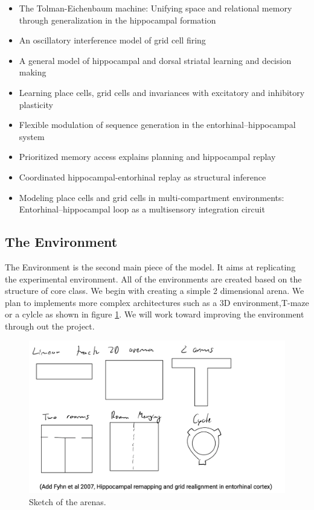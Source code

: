\documentclass{article}
\begin{document}
\begin{itemize}
 
    \item The Tolman-Eichenbaum machine: Unifying space and relational memory through generalization in the hippocampal formation \cite{whittington2020tolman}
    \item An oscillatory interference model of grid cell firing \cite{burgess2007oscillatory}
    \item A general model of hippocampal and dorsal striatal learning and decision making \cite{geerts2020general}
    \item Learning place cells, grid cells and invariances with excitatory and inhibitory plasticity \cite{weber2018learning}
    \item Flexible modulation of sequence generation in the entorhinal--hippocampal system \cite{mcnamee2021flexible}
    \item Prioritized memory access explains planning and hippocampal replay \cite{mattar2018prioritized}
    \item Coordinated hippocampal-entorhinal replay as structural inference \cite{evans2019coordinated}
    \item Modeling place cells and grid cells in multi-compartment environments: Entorhinal--hippocampal loop as a multisensory integration circuit\cite{li2020modeling}
\end{itemize}

\subsection{The Environment}

The Environment is the second main piece of the model. It aims at replicating the experimental environment. 
All of the environments are created based on the structure of core class. We begin with creating a simple 2 dimensional arena. We plan to implements more complex architectures such as a 3D environment,T-maze or a cylcle as shown in figure \ref{Env}. We will work toward improving the environment through out the project.
\begin{figure}
\centering
\includegraphics[scale=0.5]{Env.png}
\caption{ Sketch of the arenas.}
\label{Env}
\end{figure}
\end{document}

